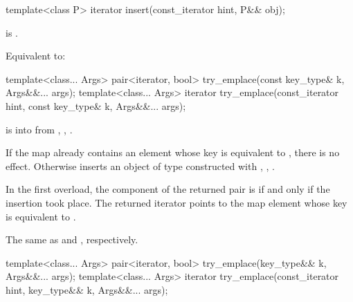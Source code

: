 %
\begin{itemdecl}
template<class P>
  iterator insert(const_iterator hint, P&& obj);
\end{itemdecl}

\begin{itemdescr}
\pnum
\constraints
{} is .

\pnum
\effects
Equivalent to:
\end{itemdescr}

%
\begin{itemdecl}
template<class... Args>
  pair<iterator, bool> try_emplace(const key_type& k, Args&&... args);
template<class... Args>
  iterator try_emplace(const_iterator hint, const key_type& k, Args&&... args);
\end{itemdecl}

\begin{itemdescr}
\pnum
\expects
{} is  into 
from , ,
.

\pnum
\effects
If the map already contains an element
whose key is equivalent to ,
there is no effect.
Otherwise inserts an object of type 
constructed with , ,
.

\pnum
\returns
In the first overload,
the  component of the returned pair is 
if and only if the insertion took place.
The returned iterator points to the map element
whose key is equivalent to .

\pnum
\complexity
The same as  and ,
respectively.
\end{itemdescr}

%
\begin{itemdecl}
template<class... Args>
  pair<iterator, bool> try_emplace(key_type&& k, Args&&... args);
template<class... Args>
  iterator try_emplace(const_iterator hint, key_type&& k, Args&&... args);
\end{itemdecl}

